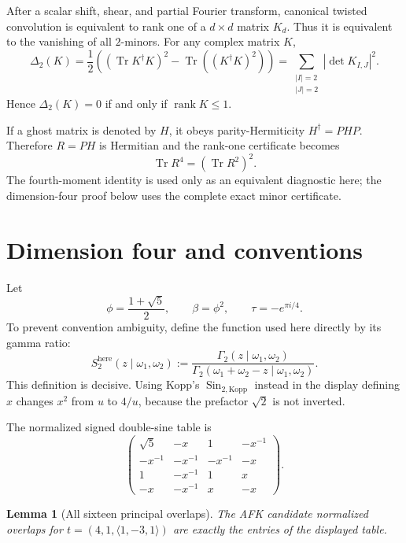 \documentclass[11pt]{article}
\newtheorem{lemma}[theorem]{Lemma}
\newcommand{\Tr}{\operatorname{Tr}}
\begin{document}
After a scalar shift, shear, and partial Fourier transform, canonical
twisted convolution is equivalent to rank one of a $d\times d$ matrix
$K_d$.  Thus it is equivalent to the vanishing of all $2$-minors.
For any complex matrix $K$,
\[
 \Delta_2(K)=\frac12\left((\Tr K^\dagger K)^2
 -\Tr((K^\dagger K)^2)\right)
 =\sum_{\substack{|I|=2\\|J|=2}}|\det K_{I,J}|^2.
\]
Hence $\Delta_2(K)=0$ if and only if $\operatorname{rank}K\le1$.

If a ghost matrix is denoted by $H$, it obeys
parity-Hermiticity $H^\dagger=PHP$.  Therefore
$R=PH$ is Hermitian and the rank-one certificate becomes
\[
 \Tr R^4=(\Tr R^2)^2.
\]
The fourth-moment identity is used only as an equivalent diagnostic
here; the dimension-four proof below uses the complete exact minor
certificate.

\section{Dimension four and conventions}

Let
\[
 \phi=\frac{1+\sqrt5}{2},\qquad \beta=\phi^2,\qquad
 \tau=-e^{\pi i/4}.
\]
To prevent convention ambiguity, define the function used here directly
by its gamma ratio:
\[
 S_2^{\mathrm{here}}(z\mid\omega_1,\omega_2)
 :=\frac{\Gamma_2(z\mid\omega_1,\omega_2)}
 {\Gamma_2(\omega_1+\omega_2-z\mid\omega_1,\omega_2)}.
\]
This definition is decisive.  Using Kopp's
$\operatorname{Sin}_{2,\mathrm{Kopp}}$ instead in the display defining
$x$ changes $x^2$ from $u$ to $4/u$, because the prefactor $\sqrt2$
is not inverted.

The normalized signed double-sine table is
\[
\begin{pmatrix}
\sqrt5&-x&1&-x^{-1}\\
-x^{-1}&-x^{-1}&-x^{-1}&-x\\
1&-x^{-1}&1&x\\
-x&-x^{-1}&x&-x
\end{pmatrix}.
\]

\begin{lemma}[All sixteen principal overlaps]\label{lem:overlaptable}
The AFK candidate normalized overlaps for
$t=(4,1,\langle1,-3,1\rangle)$ are exactly the entries of the
displayed table.
\end{lemma}
\end{document}
